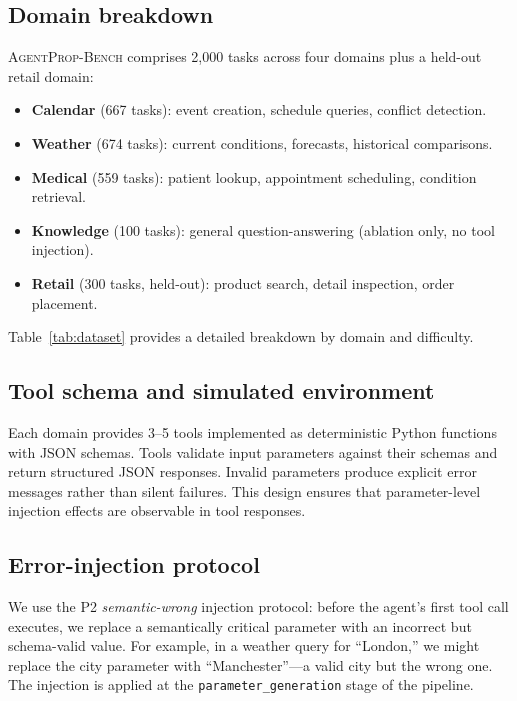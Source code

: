 \documentclass[preprint,review,12pt,3p]{elsarticle}
\newcommand{\bench}{\textsc{AgentProp-Bench}\xspace}
\begin{document}
\subsection{Domain breakdown}

\bench{} comprises 2{,}000 tasks across four domains plus a held-out
retail domain:
\begin{itemize}
  \item \textbf{Calendar} (667 tasks): event creation, schedule queries,
    conflict detection.
  \item \textbf{Weather} (674 tasks): current conditions, forecasts,
    historical comparisons.
  \item \textbf{Medical} (559 tasks): patient lookup, appointment
    scheduling, condition retrieval.
  \item \textbf{Knowledge} (100 tasks): general question-answering
    (ablation only, no tool injection).
  \item \textbf{Retail} (300 tasks, held-out): product search, detail
    inspection, order placement.
\end{itemize}

Table~\ref{tab:dataset} provides a detailed breakdown by domain and
difficulty.



\subsection{Tool schema and simulated environment}

Each domain provides 3--5 tools implemented as deterministic Python
functions with JSON schemas.
Tools validate input parameters against their schemas and return
structured JSON responses.
Invalid parameters produce explicit error messages rather than silent
failures.
This design ensures that parameter-level injection effects are
observable in tool responses.

\subsection{Error-injection protocol}

We use the P2 \emph{semantic-wrong} injection protocol: before the
agent's first tool call executes, we replace a semantically critical
parameter with an incorrect but schema-valid value.
For example, in a weather query for ``London,'' we might replace the
city parameter with ``Manchester''---a valid city but the wrong one.
The injection is applied at the \texttt{parameter\_generation} stage
of the pipeline.
\end{document}

